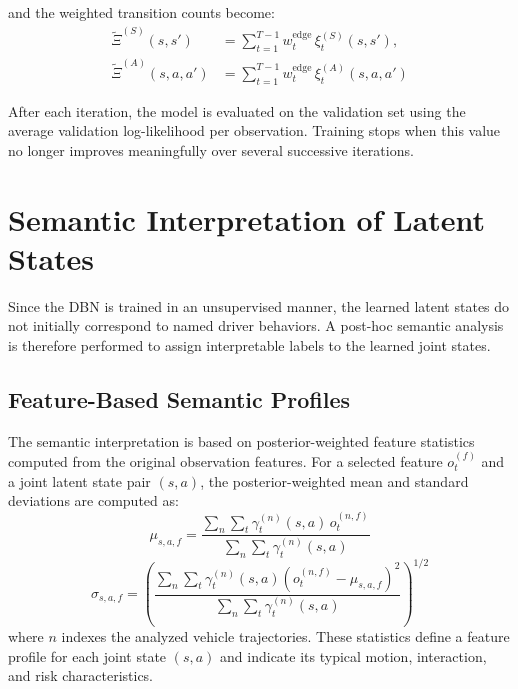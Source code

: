 and the weighted transition counts become:
\begin{align}
\widetilde{\Xi}^{(S)}(s,s') &= \sum_{t=1}^{T-1} w_t^{\mathrm{edge}}\,\xi_t^{(S)}(s,s'), \\
\widetilde{\Xi}^{(A)}(s,a,a') &= \sum_{t=1}^{T-1} w_t^{\mathrm{edge}}\,\xi_t^{(A)}(s,a,a')
\end{align}

\par After each iteration, the model is evaluated on the validation set using the average validation log-likelihood per observation. 
Training stops when this value no longer improves meaningfully over several successive iterations. 




\section{Semantic Interpretation of Latent States}
\label{sec:semantic_interpretation_latent_states}

Since the \ac{DBN} is trained in an unsupervised manner, the learned latent states do not initially correspond to named driver behaviors. 
A post-hoc semantic analysis is therefore performed to assign interpretable labels to the learned joint states. 

\subsection{Feature-Based Semantic Profiles}
\label{subsec:feature_based_semantic_profiles}

The semantic interpretation is based on posterior-weighted feature statistics computed from the original observation features. 
For a selected feature \(o_t^{(f)}\) and a joint latent state pair \((s,a)\), the posterior-weighted mean and standard deviations are computed as:
\begin{equation}
\mu_{s,a,f}
=
\frac{\sum_n \sum_t \gamma_t^{(n)}(s,a)\,o_t^{(n,f)}}
{\sum_n \sum_t \gamma_t^{(n)}(s,a)}
\end{equation}
\begin{equation}
\sigma_{s,a,f}
=
\left(
\frac{\sum_n \sum_t \gamma_t^{(n)}(s,a)\left(o_t^{(n,f)}-\mu_{s,a,f}\right)^2}
{\sum_n \sum_t \gamma_t^{(n)}(s,a)}
\right)^{1/2}
\end{equation}
where $n$ indexes the analyzed vehicle trajectories.
These statistics define a feature profile for each joint state $(s,a)$ and indicate its typical motion, interaction, and risk characteristics.

